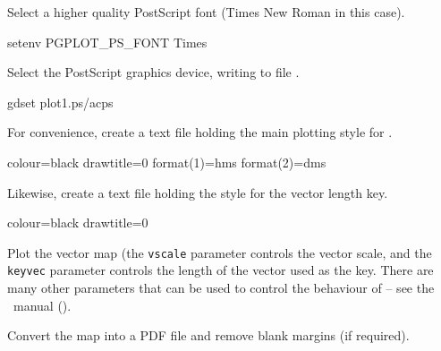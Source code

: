 Select a higher quality PostScript font (Times New Roman in this case).

\begin{terminalv}
setenv PGPLOT_PS_FONT Times
\end{terminalv}

Select the PostScript graphics device, writing to file .

\begin{terminalv}
gdset plot1.ps/acps
\end{terminalv}

For convenience, create a text file holding the main plotting style for
.

\begin{terminalv}
colour=black
drawtitle=0
format(1)=hms
format(2)=dms
\end{terminalv}

Likewise, create a text file holding the style for the vector length
key.

\begin{terminalv}
colour=black
drawtitle=0
\end{terminalv}


Plot the vector map (the \texttt{vscale} parameter controls the vector
scale, and the \texttt{keyvec} parameter controls the length of the
vector used as the key. There are many other parameters that can be
used to control the behaviour of  -- see the \polpack\
manual ().

\begin{terminalv}
\end{terminalv}

Convert the map into a PDF file and remove blank margins (if required).

\begin{terminalv}
\end{terminalv}


